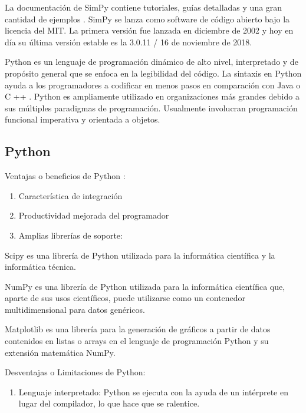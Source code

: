 La documentación de SimPy contiene tutoriales, guías detalladas y una gran cantidad de ejemplos \parencite{Simpy}. SimPy se lanza como software de código abierto bajo la licencia del MIT. La primera versión fue lanzada en diciembre de 2002 y hoy en día su última versión estable es la 3.0.11 / 16 de noviembre de 2018.\newline

Python es un lenguaje de programación dinámico de alto nivel, interpretado y de propósito general que se enfoca en la legibilidad del código. La sintaxis en Python ayuda a los programadores a codificar en menos pasos en comparación con Java o C ++ \parencite{PythonVentajas}. Python es ampliamente utilizado en organizaciones más grandes debido a sus múltiples paradigmas de programación. Usualmente involucran programación funcional imperativa y orientada a objetos. 

\subsection{Python}

Ventajas o beneficios de Python \parencite{PythonVentajas}:
\begin{enumerate}
\item  Característica de integración
\item  Productividad mejorada del programador
\item  Amplias librerías de soporte:
\end{enumerate}

Scipy es una librería de Python utilizada para la informática científica y la informática técnica. \newline

NumPy es una librería de Python utilizada para la informática científica que, aparte de sus usos científicos, puede utilizarse como un contenedor multidimensional para datos genéricos.\newline

Matplotlib es una librería para la generación de gráficos a partir de datos contenidos en listas o arrays en el lenguaje de programación Python y su extensión matemática NumPy.\newline

Desventajas o Limitaciones de Python:
\begin{enumerate}
\item  Lenguaje interpretado: Python se ejecuta con la ayuda de un intérprete en lugar del compilador, lo que hace que se ralentice.
\end{enumerate}

